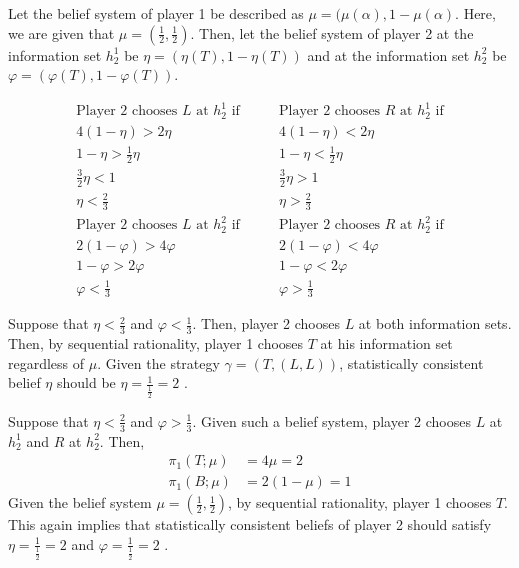 \documentclass[]{article}
\begin{document}
 Let the belief system of player 1 be described as $\mu = (\mu(\alpha), 1 - \mu(\alpha)$. Here, we are given that $\mu = (\frac{1}{2}, \frac{1}{2})$. Then, let the belief system of player 2 at the information set $h_2^1$ be $\eta = (\eta(T), 1 - \eta(T))$ and at the information set $h_2^2$ be $\varphi = (\varphi(T), 1 - \varphi(T))$.
 
 \begin{equation}
 	\begin{matrix}
	 	\text{Player 2 chooses }L\text{ at }h_2^1\text{ if}\\
	 	4(1 - \eta) > 2\eta\\
	 	1 - \eta > \frac{1}{2}\eta\\
	 	\frac{3}{2}\eta < 1 \\
	 	\eta < \frac{2}{3} \\
	 	\text{Player 2 chooses }L\text{ at }h_2^2\text{ if}\\
	 	2(1 - \varphi) > 4\varphi \\
	 	1 - \varphi > 2\varphi \\
	 	\varphi < \frac{1}{3}
 	\end{matrix} \qquad \begin{matrix}
	 	\text{Player 2 chooses }R\text{ at }h_2^1\text{ if}\\
	 	4(1 - \eta) < 2\eta\\
	 	1 - \eta < \frac{1}{2}\eta\\
	 	\frac{3}{2}\eta > 1 \\
	 	\eta > \frac{2}{3} \\
	 	\text{Player 2 chooses }R\text{ at }h_2^2\text{ if}\\
	 	2(1 - \varphi) < 4\varphi \\
	 	1 - \varphi < 2\varphi \\
	 	\varphi > \frac{1}{3}
 	\end{matrix} \nonumber
 \end{equation}
 
 Suppose that $\eta < \frac{2}{3}$ and $\varphi < \frac{1}{3}$. Then, player 2 chooses $L$ at both information sets. Then, by sequential rationality, player 1 chooses $T$ at his information set regardless of $\mu$. Given the strategy $\gamma = (T, (L, L))$, statistically consistent belief $\eta$ should be $\eta = \frac{1}{\frac{1}{2}} = 2$ \Lightning.
 
Suppose that $\eta < \frac{2}{3}$ and $\varphi > \frac{1}{3}$. Given such a belief system, player 2 chooses $L$ at $h_2^1$ and $R$ at $h_2^2$. Then, 
\begin{equation}
	\begin{split}
		\pi_1(T; \mu)& = 4\mu = 2 \\
		\pi_1(B; \mu)& = 2(1 - \mu) = 1 \nonumber
	\end{split}
\end{equation}
Given the belief system $\mu = (\frac{1}{2}, \frac{1}{2})$, by sequential rationality, player 1 chooses $T$. This again implies that statistically consistent beliefs of player 2 should satisfy $\eta = \frac{1}{\frac{1}{2}} = 2$ and $\varphi = \frac{1}{\frac{1}{2}} = 2$ \Lightning.
\end{document}

